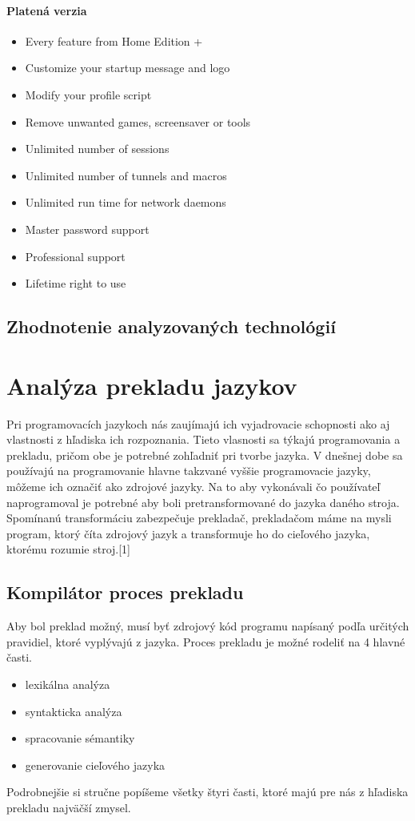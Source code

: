 \paragraph{Platená verzia}

\begin{itemize}
	\item Every feature from Home Edition +
	\item Customize your startup message and logo
	\item Modify your profile script
	\item Remove unwanted games, screensaver or tools
	\item Unlimited number of sessions
	\item Unlimited number of tunnels and macros
	\item Unlimited run time for network daemons
	\item Master password support
	\item Professional support
	\item Lifetime right to use
\end{itemize}

\subsection{Zhodnotenie analyzovaných technológií}

\section{Analýza prekladu jazykov}
\indent Pri programovacích jazykoch nás zaujímajú ich vyjadrovacie schopnosti ako aj vlastnosti z hľadiska ich rozpoznania. Tieto vlasnosti sa týkajú programovania a prekladu, pričom obe je potrebné zohľadniť pri tvorbe jazyka. V dnešnej dobe sa používajú na programovanie hlavne takzvané vyššie programovacie jazyky, môžeme ich označiť ako zdrojové jazyky. Na to aby vykonávali čo používateľ naprogramoval je potrebné aby boli pretransformované do jazyka daného stroja. Spomínanú transformáciu zabezpečuje prekladač, prekladačom máme na mysli program, ktorý číta zdrojový jazyk a transformuje ho do cieľového jazyka, ktorému rozumie stroj.[1]

\subsection{Kompilátor proces prekladu}
Aby bol preklad možný, musí byť zdrojový kód programu napísaný podľa určitých pravidiel, ktoré vyplývajú z jazyka. Proces prekladu je možné rodeliť na 4 hlavné časti.
\begin{itemize}
	\item lexikálna analýza
	\item syntakticka analýza
	\item spracovanie sémantiky
	\item generovanie cieľového jazyka
\end{itemize}
\indent Podrobnejšie si stručne popíšeme všetky štyri časti, ktoré majú pre nás z hľadiska prekladu najväčší zmysel.
\newline
